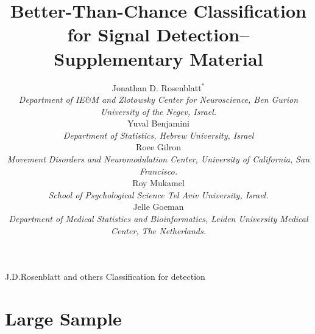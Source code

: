 \documentclass[oupdraft]{bio}
\begin{document}
\title{Better-Than-Chance Classification for Signal Detection-- Supplementary Material}

\author{Jonathan D. Rosenblatt$^\ast$ \\ 
	\textit{Department of IE\&M and Zlotowsky Center for Neuroscience, 
		Ben Gurion University of the Negev, Israel.} 
	\\ Yuval Benjamini \\
	\textit{Department of Statistics, Hebrew University, Israel}	
	\\ Roee Gilron \\ 
	\textit{Movement Disorders and Neuromodulation Center, University of California, San Francisco.}
	\\ Roy Mukamel \\ 
	\textit{School of Psychological Science Tel Aviv University, Israel.}
	\\ Jelle Goeman \\ 
	\textit{Department of Medical Statistics and Bioinformatics, Leiden University Medical Center, The Netherlands.}
}


\markboth%
{J.D.Rosenblatt and others}
{Classification for detection}

\maketitle



\section{Large Sample}
\end{document}
